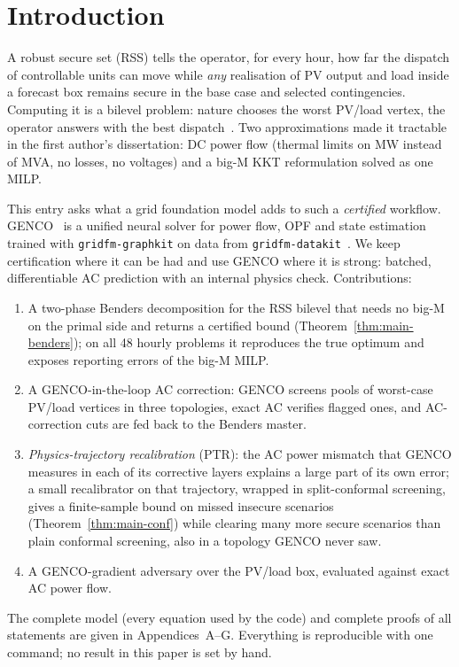 \section{Introduction}
A robust secure set (RSS) tells the operator, for every hour, how far the dispatch of
controllable units can move while \emph{any} realisation of PV output and load inside a
forecast box remains secure in the base case and selected contingencies. Computing it is
a bilevel problem: nature chooses the worst PV/load vertex, the operator answers with the
best dispatch~\cite{abdillah2017thesis,yorino2018}. Two approximations made it tractable in the
first author's dissertation: DC power flow (thermal limits on MW instead of MVA, no
losses, no voltages) and a big-M KKT reformulation solved as one MILP.

This entry asks what a grid foundation model adds to such a \emph{certified} workflow.
GENCO~\cite{genco2026} is a unified neural solver for power flow, OPF and state
estimation trained with \texttt{gridfm-graphkit} on data from
\texttt{gridfm-datakit}~\cite{datakit2025}. We keep certification where it can be had
and use GENCO where it is strong: batched, differentiable AC prediction with an
internal physics check. Contributions:
\begin{enumerate}
\item A two-phase Benders decomposition for the RSS bilevel that needs no big-M on the
  primal side and returns a certified bound (Theorem~\ref{thm:main-benders}); on all 48 hourly
  problems it reproduces the true optimum and exposes reporting errors of the big-M MILP.
\item A GENCO-in-the-loop AC correction: GENCO screens pools of worst-case PV/load
  vertices in three topologies, exact AC verifies flagged ones, and AC-correction cuts
  are fed back to the Benders master.
\item \emph{Physics-trajectory recalibration} (PTR): the AC power mismatch that GENCO
  measures in each of its corrective layers explains a large part of its own error; a
  small recalibrator on that trajectory, wrapped in split-conformal screening, gives a
  finite-sample bound on missed insecure scenarios (Theorem~\ref{thm:main-conf}) while
  clearing many more secure scenarios than plain conformal screening, also in a topology
  GENCO never saw.
\item A GENCO-gradient adversary over the PV/load box, evaluated against exact AC power
  flow.
\end{enumerate}
The complete model (every equation used by the code) and complete proofs of all
statements are given in Appendices~A--G. Everything is reproducible with one command;
no result in this paper is set by hand.

